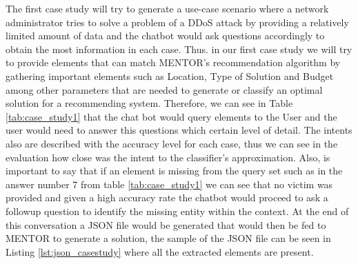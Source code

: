 The first case study will try to generate a use-case scenario where a network administrator tries to solve a problem of a DDoS attack by providing a relatively limited amount of data and the chatbot would ask questions accordingly to obtain the most information in each case. Thus. in our first case study we will try to provide elements that can match MENTOR's \cite{recomendationSystem} recommendation algorithm by gathering important elements such as Location, Type of Solution and Budget among other parameters that are needed to generate or classify an optimal solution for a recommending system. Therefore, we can see in Table \ref{tab:case_study1} that the chat bot would query elements to the User and the user would need to answer this questions which certain level of detail. The intents also are described with the accuracy level for each case, thus we can see in the evaluation how close was the intent to the classifier's approximation. Also, is important to say that if an element is missing from the query set such as in the answer number 7 from table \ref{tab:case_study1} we can see that no victim was provided and given a high accuracy rate the chatbot would proceed to ask a followup question to identify the missing entity within the context. At the end of this conversation a JSON file would be generated that would then be fed to MENTOR to generate a solution, the sample of the JSON file can be seen in Listing \ref{lst:json_casestudy} where all the extracted elements are present.

